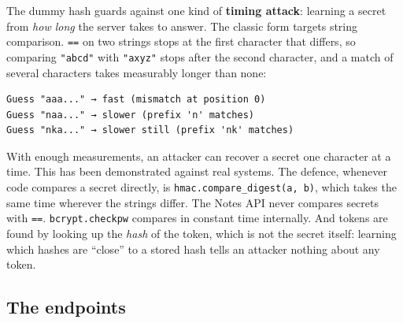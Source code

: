 The dummy hash guards against one kind of \textbf{timing attack}: learning a secret from \emph{how long} the server takes to answer. The classic form targets string comparison. \texttt{==} on two strings stops at the first character that differs, so comparing \texttt{"abcd"} with \texttt{"axyz"} stops after the second character, and a match of several characters takes measurably longer than none:

\begin{outputbox}[short]
\begin{Verbatim}[fontsize=\codesize, breaklines, breakanywhere, breaksymbolleft={\tiny\textcolor{muted}{$\hookrightarrow$}}]
Guess "aaa..." → fast (mismatch at position 0)
Guess "naa..." → slower (prefix 'n' matches)
Guess "nka..." → slower still (prefix 'nk' matches)
\end{Verbatim}
\end{outputbox}

\noindent{}With enough measurements, an attacker can recover a secret one character at a time. This has been demonstrated against real systems. The defence, whenever code compares a secret directly, is \texttt{hmac.}\allowbreak{}\texttt{compare\_}\allowbreak{}\texttt{digest(a,}\allowbreak{}\texttt{\ b)}, which takes the same time wherever the strings differ. The Notes API never compares secrets with \texttt{==}. \texttt{bcrypt.checkpw} compares in constant time internally. And tokens are found by looking up the \emph{hash} of the token, which is not the secret itself: learning which hashes are ``close'' to a stored hash tells an attacker nothing about any token.

\subsection*{The endpoints}\label{38-security:the-endpoints}


